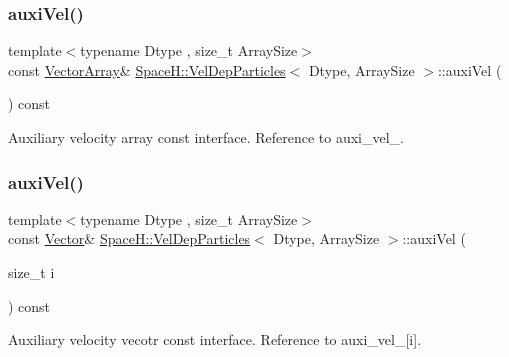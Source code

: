 \subsubsection{\texorpdfstring{auxi\+Vel()}{auxiVel()}\hspace{0.1cm}{\footnotesize\ttfamily [1/2]}}
{\footnotesize\ttfamily template$<$typename Dtype , size\+\_\+t Array\+Size$>$ \\
const \mbox{\hyperlink{class_space_h_1_1_vel_indep_particles_aa9983058940249df8b00fa800e8cbad2}{Vector\+Array}}\& \mbox{\hyperlink{class_space_h_1_1_vel_dep_particles}{Space\+H\+::\+Vel\+Dep\+Particles}}$<$ Dtype, Array\+Size $>$\+::auxi\+Vel (\begin{DoxyParamCaption}{ }\end{DoxyParamCaption}) const\hspace{0.3cm}{\ttfamily [inline]}}



Auxiliary velocity array const interface. Reference to auxi\+\_\+vel\+\_\+. 

\mbox{\label{class_space_h_1_1_vel_dep_particles_a327db917c8b99eba9f81278f3ae1b0fc}} 
\subsubsection{\texorpdfstring{auxi\+Vel()}{auxiVel()}\hspace{0.1cm}{\footnotesize\ttfamily [2/2]}}
{\footnotesize\ttfamily template$<$typename Dtype , size\+\_\+t Array\+Size$>$ \\
const \mbox{\hyperlink{class_space_h_1_1_vel_indep_particles_a61bbcfdb0dc7f99f3c68af69a755c935}{Vector}}\& \mbox{\hyperlink{class_space_h_1_1_vel_dep_particles}{Space\+H\+::\+Vel\+Dep\+Particles}}$<$ Dtype, Array\+Size $>$\+::auxi\+Vel (\begin{DoxyParamCaption}\item[{size\+\_\+t}]{i }\end{DoxyParamCaption}) const\hspace{0.3cm}{\ttfamily [inline]}}



Auxiliary velocity vecotr const interface. Reference to auxi\+\_\+vel\+\_\+\mbox{[}i\mbox{]}. 

\mbox{\label{class_space_h_1_1_vel_dep_particles_a12c9a60ac96d922444e337b95749c806}} 
